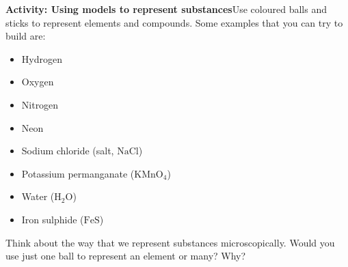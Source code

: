     \noindent
  \label{m38708*eip-326}\noindent{}\textbf{Activity: Using models to represent substances}Use coloured balls and sticks to represent elements and compounds. Some examples that you can try to build are:
\label{m38708*eip-id1166921187210}\begin{itemize}[noitemsep]
            \item Hydrogen\item Oxygen\item Nitrogen\item Neon\item Sodium chloride (salt, $\mathrm{NaCl}$)\item Potassium permanganate (${\mathrm{KMnO}}_{4}$)\item Water (${\mathrm{H}}_{2}\mathrm{O}$)\item Iron sulphide ($\mathrm{FeS}$)\end{itemize}
Think about the way that we represent substances microscopically. Would you use just one ball to represent an element or many? Why? \par \label{m38708*secfhsst!!!underscore!!!id212}
